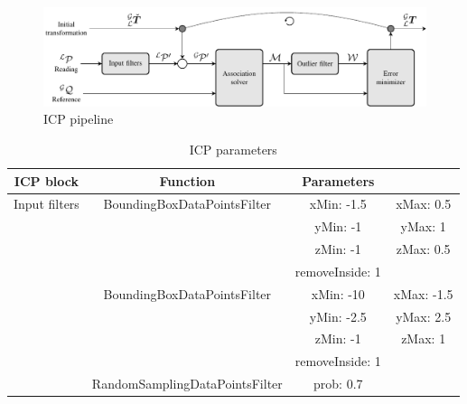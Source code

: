 
\begin{figure} [htpb]
	\centering
	\includegraphics[width=\linewidth]{figs/icp_pipeline/icp_pipeline.pdf}
	\caption{ICP pipeline}
	\label{fig:icp_pipeline}
\end{figure}


\begin{table}[htpb]
	\caption{\ac{ICP} parameters}
	\begin{center}
		\begin{tabular}{c c c c} \toprule
			ICP block      & Function                          & Parameters            &                       \\
			\midrule
			Input filters  & BoundingBoxDataPointsFilter       & xMin: -1.5            & xMax: 0.5             \\
			               &                                   & yMin: -1              & yMax: 1               \\
			               &                                   & zMin: -1              & zMax: 0.5             \\
			               &                                   & removeInside: 1                               \\
			               & BoundingBoxDataPointsFilter       & xMin: -10             & xMax: -1.5            \\
			               &                                   & yMin: -2.5            & yMax: 2.5             \\
			               &                                   & zMin: -1              & zMax: 1               \\
			               &                                   & removeInside: 1                               \\
			               & RandomSamplingDataPointsFilter    & prob: 0.7             &                       \\

\end{tabular}
\end{center}
\end{table}
